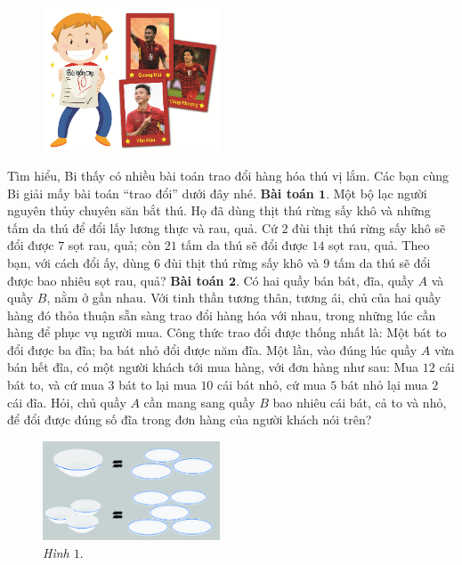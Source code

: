 	\begin{figure}[H]
		\centering
		\vspace*{-5pt}
		\captionsetup{labelformat= empty, justification=centering}
		\includegraphics[width=0.47\textwidth]{pic3}
		\vspace*{-5pt}
	\end{figure}
	Tìm hiểu, Bi thấy có nhiều bài toán trao đổi hàng hóa thú vị lắm. Các bạn cùng Bi giải mấy bài toán “trao đổi” dưới đây nhé.
	\vskip 0.15cm
	\textbf{Bài toán $\pmb{1.}$} Một bộ lạc người nguyên thủy chuyên săn bắt thú. Họ đã dùng thịt thú rừng sấy khô và những tấm da thú để đổi lấy lương thực và rau, quả. Cứ $2$ đùi thịt thú rừng sấy khô sẽ đổi được $7$ sọt rau, quả; còn $21$ tấm da thú sẽ đổi được $14$ sọt rau, quả. Theo bạn, với cách đổi ấy, dùng $6$ đùi thịt thú rừng sấy khô và $9$ tấm da thú sẽ đổi được bao nhiêu sọt rau, quả?
	\vskip 0.15cm
	\textbf{Bài toán $\pmb{2.}$} Có hai quầy bán bát, đĩa, quầy $A$ và quầy $B$, nằm ở gần nhau. Với tinh thần tương thân, tương ái, chủ của hai quầy hàng đó thỏa thuận sẵn sàng trao đổi hàng hóa với nhau, trong những lúc cần hàng để phục vụ người mua. Công thức trao đổi được thống nhất là: Một bát to đổi được ba đĩa; ba bát nhỏ đổi được năm đĩa.
	\vskip 0.15cm
	Một lần, vào đúng lúc quầy $A$ vừa bán hết đĩa, có một người khách tới mua hàng, với đơn hàng như sau: Mua $12$ cái bát to, và cứ mua $3$ bát to lại mua $10$ cái bát nhỏ, cứ mua $5$ bát nhỏ lại mua $2$ cái đĩa.
	\vskip 0.15cm
	Hỏi, chủ quầy $A$ cần mang sang quầy $B$ bao nhiêu cái bát, cả to và nhỏ, để đổi được đúng số đĩa trong đơn hàng của người khách nói trên?
	\begin{figure}[H]
		\centering
		\vspace*{-5pt}
		\captionsetup{labelformat= empty, justification=centering}
		\includegraphics[width=0.47\textwidth]{pic4}
		\caption{\small\textit{Hình $1.$}}
		\vspace*{-5pt}
	\end{figure}
